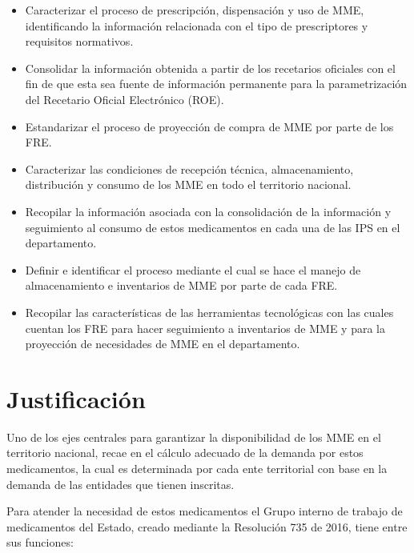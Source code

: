 \documentclass[
]{book}
\begin{document}
\begin{itemize}
\item
  Caracterizar el proceso de prescripción, dispensación y uso de MME, identificando la información relacionada con el tipo de prescriptores y requisitos normativos.
\item
  Consolidar la información obtenida a partir de los recetarios oficiales con el fin de que esta sea fuente de información permanente para la parametrización del Recetario Oficial Electrónico (ROE).
\item
  Estandarizar el proceso de proyección de compra de MME por parte de los FRE.
\item
  Caracterizar las condiciones de recepción técnica, almacenamiento, distribución y consumo de los MME en todo el territorio nacional.
\item
  Recopilar la información asociada con la consolidación de la información y seguimiento al consumo de estos medicamentos en cada una de las IPS en el departamento.
\item
  Definir e identificar el proceso mediante el cual se hace el manejo de almacenamiento e inventarios de MME por parte de cada FRE.
\item
  Recopilar las características de las herramientas tecnológicas con las cuales cuentan los FRE para hacer seguimiento a inventarios de MME y para la proyección de necesidades de MME en el departamento.
\end{itemize}

\hypertarget{justificaciuxf3n}{%
\chapter{Justificación}\label{justificaciuxf3n}}

Uno de los ejes centrales para garantizar la disponibilidad de los MME en el territorio nacional, recae en el cálculo adecuado de la demanda por estos medicamentos, la cual es determinada por cada ente territorial con base en la demanda de las entidades que tienen inscritas.

Para atender la necesidad de estos medicamentos el Grupo interno de trabajo de medicamentos del Estado, creado mediante la Resolución 735 de 2016, tiene entre sus funciones:
\end{document}
